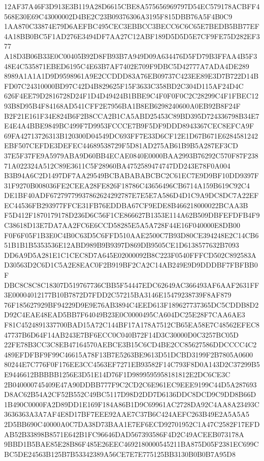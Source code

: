 \documentclass[UTF8,fontset=fandol,zihao=-4,a4paper]{ctexart}
\begin{document}
{{12AF37A46F3D913E3B119A28D6615CBE8A575656969797D54EC579178ACBFF4568E30E69C43000002D4BE2C23B09376306A3195F815DBB76A5F4B0C9
1AA870C33874E79D6AEFBC495CEC3EBBCC3BECC6C6C65E7BEDB5BB77EF4A18BB0BC5F1AD276E3494DF7AA27C12ABF189D5D5D5E7CF9FE75D282EF377
A18D3B06B33E0C00405B92D8FB93B7A949D09A634476D5FD79B3FFAA4B5F348E4C535871EBED6195C4E63B7AF7402E709F9DBC5D42777A7ADA4DE289
8989A1A1A1D9D9598961A9E2CCDDD83A76EB09737C423EE89E3D7B722D14BFD07C24310000BD97C42D4B829625F15F3633C358BD2C304D115AF24D4C
626F4EE79D2816728D24F1D4D49424B1BBE9C4F0F0F0C2C28299C4F1FBEC1293B8D95B4F84168AD541CFF2E7956BA1B8EB6298240600A0EB92B8F24F
B2F21E161F34E824B6F2B8CCA2B1CA5ABD25453C89BD395D724336798B34E7E4E4A4BBE9849BC499F7D9953FCCCE7B9F5DF9DDD8943367CEC8EFCA9F
69FA42713726313B120300D04549DC693FF7E33D6CF12E1D67B671E6284581242EBF507CEFDE3DEFEC44689538729F5D81AD275AB61B9B5A287EF3CD
37E5F37FE9A5979ABA9D60BB4ECAE0840E0000BAA2993B76292C570F87F23871A022324A512C89E3611C5F28960BA4752589474747DD243E78F0A004
B3B94A6C2D1497DF7AA29549BCBABABABCBC2C61EC7E9D9BF10DD9397F31F9270B008036FE2CEEA28FE826F18786C43656496CB6714A159B619C92C4
DE1BF40ADF67279779937862624292787E7E5E7A586D4D1C9A9DC8DC7A22EFEC44536FB293977FFCE31FB76EDDBA67CF9EDE8B466218000022BCAA3B
F5D412F1870179178D236D6C56F1CE866627B1353E114A62B509DBFEFDFB4F9C38618D13E7DA7AA2FC6E6CCD58285E5A5A728F44E16F040000E8DB00
F0F6F05F1B3E0C4B0C63D5C6FFD510AAE2500C7B93D80CE394248E2C14CB651B1B1B5353536E12ABD989B9B9397D869DB9505CE1D6138577632B7093
DD6A9D5A281E1C1CEC8D7A645E02000092B8C223F0540FFFCD502C892583AD30563D2C6D1C5A2E8EAC0F2B919BF2CA2C14AB249E9D9DDDBF7FBFBB0F
DBC8C8C8C18307D519767736CBB5F54447EDC62649AC366493AF6AAF2631FF3E00004012177B10B7872D7FDD2C57215BA3146E15479238739F8AF879
76F185627929BF94229D9E9E76AB3894C4EED613F189627737365DC5CDDB8D2D92C4EAE48EAD5BB7F64049B23E0C0000495CA604DC25E28F7CAA6AE3
F81C4524891337700BAD15A72C144BF17A178A7512CB65EA58E7C48562EFEC847737B6D64F14AB243E7BF6ECC0C040B72F14D3C30000D0C3257BC05D
22FE78B3CC3C8EB47164570AEBCE3B15C6CD4BE2CC85627586DDCCCC4C2489EFDFBF9F99C46615A78F13B7E5263BE9613D51DCBD3199F2B7805A0600
80244E7C776F0F176EE3CC4563EF7271EB93582F14C793F8D0A143D2C37299B5E9446612BBBBB1256E3D51E14D76F1D9899595958181812E2DC6CE3C
2B040000745409E47A90DDBB777F9C2CD2C6E961EC9EEE9199C44D5A287693D8AC62B54A2CF52B552C49BC5117D98D2DD7D6136DDC8DCD9C9DD8B66D
1B490C0000FA2D89DD1E169F184A86B1D9C69961AC2728DA92C4AA8A23493C3636363A3A7AF4E8D17BF7EEE92AAE7C37B6C424AEFC263B49E2A5A5A5
2D5BB690C40000A0C7DA38D73BAA1E7EF6ECD92701952C1A47C2582F17EFDAB52B33898B8571E642B1FC96646DAD567393586F4D2C49ACEEB073178A
9BBD1B5BAE85E28B86F485E26EEC4692180000545211BA875D05F2381EC699CBC5DE24563B125B7B53342389A56CE7E7E775125BB3130B0B0B7A95D8
}}
\end{document}
